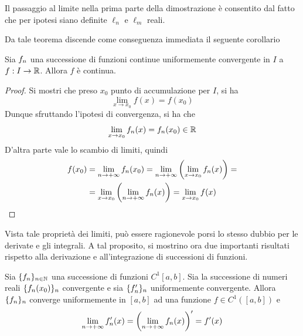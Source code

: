 \begin{oss}
    Il passaggio al limite nella prima parte della dimostrazione è consentito dal fatto che per ipotesi siano definite $\ell_n$ e $\ell_m$ reali.
\end{oss}
Da tale teorema discende come conseguenza immediata il seguente corollario
\begin{corollary} \label{Cor: Corollario a scambio limiti}
    Sia $f_n$ una successione di funzioni continue uniformemente convergente in $I$ a $f:I \to \mathbb{R}$. Allora $f$ è continua. 
\end{corollary}
\begin{proof}
    Si mostri che preso $x_0$ punto di accumulazione per $I$, si ha
    \begin{equation}
        \lim_{x \to x_0}{f(x)}= f(x_0)
    \end{equation}
    Dunque sfruttando l'ipotesi di convergenza, si ha che
    \begin{equation}
        \lim_{x \to x_0}{f_n(x)}= f_n(x_0) \in \mathbb{R}
    \end{equation}
    D'altra parte vale lo scambio di limiti, quindi
    \begin{equation}
    \begin{aligned}
          f(x_0) &=  \lim_{n \to +\infty}{f_n(x_0)}= \lim_{n \to +\infty}{\left(\lim_{x \to x_0}{f_n(x)}\right)}=\\
          &= \lim_{x \to x_0}{ \left( \lim_{n \to +\infty}{f_n(x)}\right)}=\lim_{x \to x_0}{f(x)} 
    \end{aligned}
    \end{equation}
\end{proof}
Vista tale proprietà dei limiti, può essere ragionevole porsi lo stesso dubbio per le derivate e gli integrali. A tal proposito, si mostrino ora due importanti risultati rispetto alla derivazione e all'integrazione di successioni di funzioni.
\begin{theorem} \label{Teo: Passaggio al limite sotto al segno di derivata}
    Sia $\{f_n\}_{n\in\mathbb{N}}$ una successione di funzioni $C^1[a,b]$. Sia la successione di numeri reali $\{f_n(x_0)\}_n$ convergente e sia $\{f_n'\}_n$ uniformemente convergente. Allora $\{f_n\}_n$ converge uniformemente in $[a,b]$ ad una funzione $f \in C^1([a,b])$ e 
    \begin{equation}
        \lim_{n \to +\infty}{f_n'(x)}= \left(\lim_{n \to +\infty}{f_n(x)}\right)'=f'(x)
    \end{equation}
\end{theorem}
